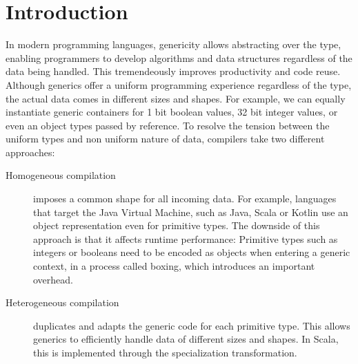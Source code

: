 \section{Introduction}
\label{sec:intro}


In modern programming languages, genericity allows abstracting over the type, enabling programmers to develop algorithms and data structures regardless of the data being handled. This tremendeously improves productivity and code reuse. Although generics offer a uniform programming experience regardless of the type, the actual data comes in different sizes and shapes. For example, we can equally instantiate generic containers for 1 bit boolean values, 32 bit integer values, or even an object types passed by reference. To resolve the tension between the uniform types and non uniform nature of data, compilers take two different approaches:
\begin{description}
  \item[Homogeneous compilation] imposes a common shape for all incoming data. For example, languages that target the Java Virtual Machine, such as Java, Scala or Kotlin use an object representation even for primitive types. The downside of this approach is that it affects runtime performance: Primitive types such as integers or booleans need to be encoded as objects when entering a generic context, in a process called boxing, which introduces an important overhead.
  \item[Heterogeneous compilation] duplicates and adapts the generic code for each primitive type. This allows generics to efficiently handle data of different sizes and shapes. In Scala, this is implemented through the specialization transformation. 
\end{description} 

